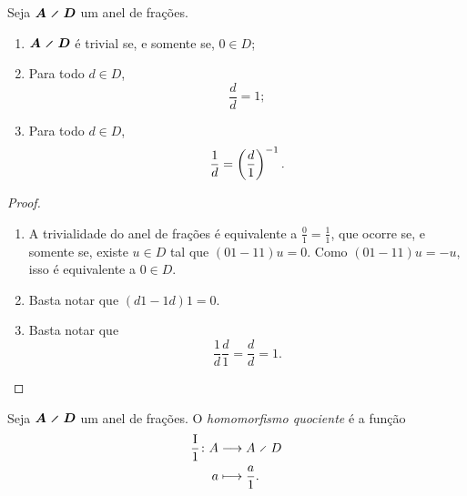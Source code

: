 \begin{proposition}
Seja $\bm{A \olddiv D}$ um anel de frações.
	\begin{enumerate}
	\item $\bm{A \olddiv D}$ é trivial se, e somente se, $0 \in D$;

	\item Para todo $d \in D$,
		\begin{equation*}
		\frac{d}{d} =1;
		\end{equation*}

	\item Para todo $d \in D$,
		\begin{equation*}
		\frac{1}{d} = \left( \frac{d}{1} \right)^{-1}.
		\end{equation*}
	\end{enumerate}
\end{proposition}
\begin{proof}
	\begin{enumerate}
	\item A trivialidade do anel de frações é equivalente a $\frac{0}{1}=\frac{1}{1}$, que ocorre se, e somente se, existe $u \in D$ tal que $(01-11)u = 0$. Como $(01-11)u=-u$, isso é equivalente a $0 \in D$.

	\item Basta notar que $(d1-1d)1=0$.

	\item Basta notar que
		\begin{equation*}
		\frac{1}{d} \frac{d}{1} = \frac{d}{d} = 1.
		\end{equation*}
	\end{enumerate}

\end{proof}

\begin{definition}
Seja $\bm{A \olddiv D}$ um anel de frações. O \emph{homomorfismo quociente} é a função
	\begin{align*}
	\func{\frac{\Id}{1}}{A}{A \olddiv D}{a}{\frac{a}{1}}.
	\end{align*}
\end{definition}

